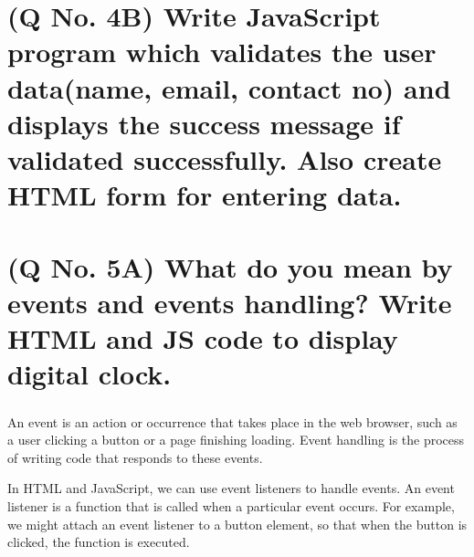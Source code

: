 \documentclass[11pt]{article}
\begin{document}
\section{(Q No. 4B) Write JavaScript program which validates the user data(name, email, contact no) and displays the success message if validated successfully. Also create HTML form for entering data.}




\section{(Q No. 5A) What do you mean by events and events handling? Write HTML and JS code to display digital clock.}
\subparagraph{}
An event is an action or occurrence that takes place in the web browser, such as a user clicking a button or a page finishing loading. Event handling is the process of writing code that responds to these events.

In HTML and JavaScript, we can use event listeners to handle events. An event listener is a function that is called when a particular event occurs. For example, we might attach an event listener to a button element, so that when the button is clicked, the function is executed.

\end{document}
